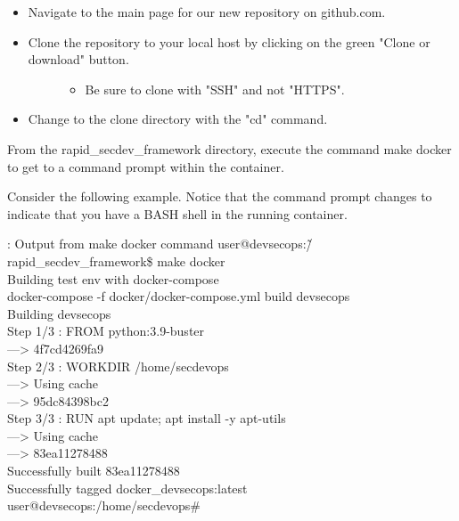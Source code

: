 \begin{itemize}
      \item
            Navigate to the main page for our new repository on github.com.
      \item
            \begin{description}
                  \item[Clone the repository to your local host by clicking on the green
                        "Clone or download" button.]
                        \begin{itemize}

                              \item
                                    Be sure to clone with "SSH" and not "HTTPS".
                        \end{itemize}
            \end{description}
      \item
            Change to the clone directory with the "cd" command.
\end{itemize}

From the rapid\_secdev\_framework directory, execute the command
make docker to get to a command prompt within the container.

Consider the following example. Notice that the command prompt changes
to indicate that you have a BASH shell in the running container.

\begin{mybox}{\thetcbcounter: Output from make docker command}
      user@devsecops:\~/rapid\_secdev\_framework\$ make docker\\
      Building test env with docker-compose\\
      docker-compose -f docker/docker-compose.yml build devsecops\\
      Building devsecops\\
      Step 1/3 : FROM python:3.9-buster\\
      ---> 4f7cd4269fa9\\
      Step 2/3 : WORKDIR /home/secdevops\\
      ---> Using cache\\
      ---> 95dc84398bc2\\
      Step 3/3 : RUN apt update; apt install -y apt-utils\\
      ---> Using cache\\
      ---> 83ea11278488\\
      Successfully built 83ea11278488\\
      Successfully tagged docker\_devsecops:latest\\
      user@devsecops:/home/secdevops\#
\end{mybox}


